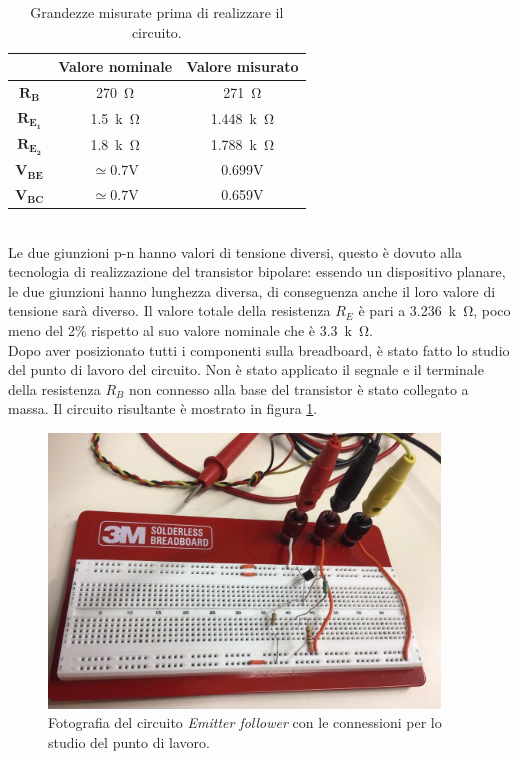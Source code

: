 \documentclass{report}
\begin{document}
\begin{table}[h]
	\centering
	\begin{tabular}{|c|c|c|}
	\cline{2-3} 
	\multicolumn{1}{c|}{} & \textbf{Valore nominale} & \textbf{Valore misurato}\\ 
		\hline
		$\mathbf{R_B}$ & \SI{270}{\ohm} & \SI{271}{\ohm} \\ 
		\hline
		$\mathbf{R_{E_1}}$& \SI{1.5}{k\ohm} & \SI{1.448}{k\ohm} \\ 
		\hline
		$\mathbf{R_{E_2}}$& \SI{1.8}{k\ohm} & \SI{1.788}{k\ohm} \\ 
		\hline
		$\mathbf{V_{BE}}$& $\mathrm{ \simeq0.7V}$ & 0.699V \\ 
		\hline
		$\mathbf{V_{BC}}$& $\mathrm{ \simeq0.7V}$  & 0.659V \\ 
		\hline
	\end{tabular}
	
\caption{Grandezze misurate prima di realizzare il circuito.}
\label{table:EFv1_comp}
\end{table}
\\ Le due giunzioni p-n hanno valori di tensione diversi, questo è dovuto alla tecnologia di realizzazione del transistor bipolare: essendo un dispositivo planare, le due giunzioni hanno lunghezza diversa, di conseguenza anche il loro valore di tensione sarà diverso. Il valore totale della resistenza $R_E$ è pari a \SI{3.236}{k\ohm}, poco meno del 2\% rispetto al suo valore nominale che è \SI{3.3}{k\ohm}.
\\\indent Dopo aver posizionato tutti i componenti sulla breadboard, è stato fatto lo studio del punto di lavoro del circuito. Non è stato applicato il segnale e il terminale della resistenza $R_B$ non connesso alla base del transistor è stato collegato a massa. Il circuito risultante è mostrato in figura \ref{figura:fotoEFv1_pl}.
\begin{figure}[h]
\centering
\includegraphics[height=7.3cm]{immagini/fotoEFv1_pl}
\caption{Fotografia del circuito \textit{Emitter follower} con le connessioni per lo studio del punto di lavoro.}
\label{figura:fotoEFv1_pl}
\end{figure}
\end{document}
